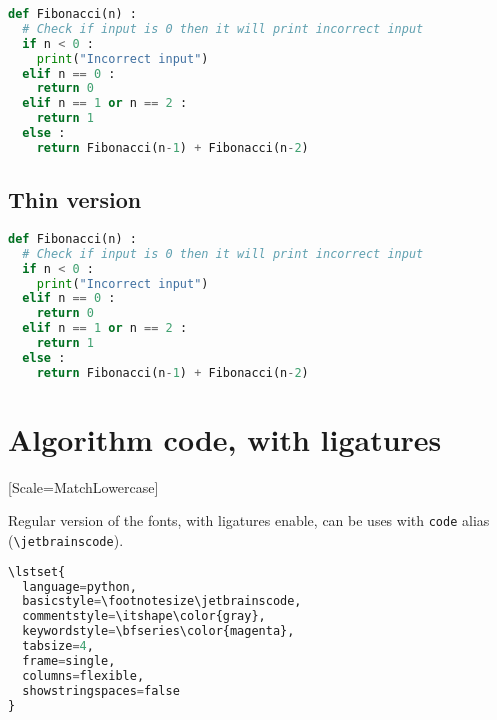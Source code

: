 \documentclass{article}
\begin{document}
\begin{lstlisting}[language=python,basicstyle=\footnotesize\jetbrainsmonoextralight,commentstyle=\itshape\color{gray},keywordstyle=\bfseries\color{magenta},tabsize=4,frame=single]
def Fibonacci(n) :
  # Check if input is 0 then it will print incorrect input
  if n < 0 :
    print("Incorrect input")
  elif n == 0 :
    return 0
  elif n == 1 or n == 2 :
    return 1
  else :
    return Fibonacci(n-1) + Fibonacci(n-2)
\end{lstlisting}

\subsection{Thin version}

\begin{lstlisting}[language=python,basicstyle=\footnotesize\jetbrainsmonothin,commentstyle=\itshape\color{gray},keywordstyle=\bfseries\color{magenta},tabsize=4,frame=single]
def Fibonacci(n) :
  # Check if input is 0 then it will print incorrect input
  if n < 0 :
    print("Incorrect input")
  elif n == 0 :
    return 0
  elif n == 1 or n == 2 :
    return 1
  else :
    return Fibonacci(n-1) + Fibonacci(n-2)
\end{lstlisting}

\pagebreak

\section{Algorithm code, with ligatures}

\setmonofont{CMU Typewriter Text}[Scale=MatchLowercase]

Regular version of the fonts, with ligatures enable, can be uses with \texttt{code} alias (\lstinline[language={[latex]TeX},basicstyle=\ttfamily]|\jetbrainscode|).

\makeatletter
\renewcommand*\verbatim@nolig@list{}
\makeatother

\begin{lstlisting}[language=python,basicstyle=\footnotesize\jetbrainscode,commentstyle=\itshape\color{gray},keywordstyle=\bfseries\color{magenta},tabsize=4,frame=single,columns=flexible,showstringspaces=false]
\lstset{
  language=python,
  basicstyle=\footnotesize\jetbrainscode,
  commentstyle=\itshape\color{gray},
  keywordstyle=\bfseries\color{magenta},
  tabsize=4,
  frame=single,
  columns=flexible,
  showstringspaces=false
}
\end{lstlisting}
\end{document}

